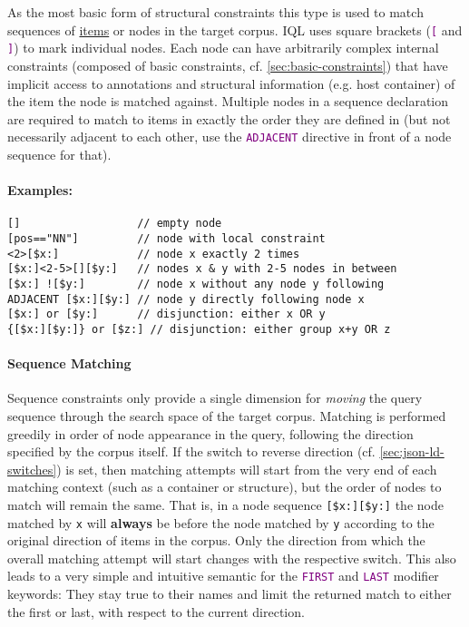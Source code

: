 \documentclass[11pt,a4paper,portrait]{article}
\newcommand{\iql}{IQL\xspace}
\newcommand{\keyword}[1]{\textcolor{purple}{\texttt{#1}}}
\newcommand{\member}[1]{\texttt{#1}}
\newcommand{\repoUrl}{https://github.com/ICARUS-tooling/icarus2-modeling-framework/blob/dev/}
\newcommand{\modelsUrl}{\repoUrl icarus2-model-api/src/main/java/de/ims/icarus2/model/api/}
\newcommand{\repoLink}[2]{\href{#1}{#2}}
\begin{document}
As the most basic form of structural constraints this type is used to match sequences of \repoLink{\modelsUrl members/item/Item.java}{items} or nodes in the target corpus.
\iql uses square brackets (\keyword{[} and \keyword{]}) to mark individual nodes.
Each node can have arbitrarily complex internal constraints (composed of basic constraints, cf. \ref{sec:basic-constraints}) that have implicit access to annotations and structural information (e.g. host container) of the item the node is matched against.
Multiple nodes in a sequence declaration are required to match to items in exactly the order they are defined in (but not necessarily adjacent to each other, use the \keyword{ADJACENT} directive in front of a node sequence for that).

\paragraph{Examples:}

\begin{verbatim}
[]                  // empty node
[pos=="NN"]         // node with local constraint
<2>[$x:]            // node x exactly 2 times       
[$x:]<2-5>[][$y:]   // nodes x & y with 2-5 nodes in between
[$x:] ![$y:]        // node x without any node y following
ADJACENT [$x:][$y:] // node y directly following node x
[$x:] or [$y:]      // disjunction: either x OR y
{[$x:][$y:]} or [$z:] // disjunction: either group x+y OR z
\end{verbatim}

\paragraph{Sequence Matching}
\noindent Sequence constraints only provide a single dimension for \textit{moving} the query sequence through the search space of the target corpus.
Matching is performed greedily in order of node appearance in the query, following the direction specified by the corpus itself.
If the switch to reverse direction (cf. \ref{sec:json-ld-switches}) is set, then matching attempts will start from the very end of each matching context (such as a container or structure), but the order of nodes to match will remain the same.
That is, in a node sequence \verb|[$x:][$y:]| the node matched by \member{x} will \textbf{always} be before the node matched by \member{y} according to the original direction of items in the corpus.
Only the direction from which the overall matching attempt will start changes with the respective switch.
This also leads to a very simple and intuitive semantic for the \keyword{FIRST} and \keyword{LAST} modifier keywords: They stay true to their names and limit the returned match to either the first or last, with respect to the current direction.
\end{document}
